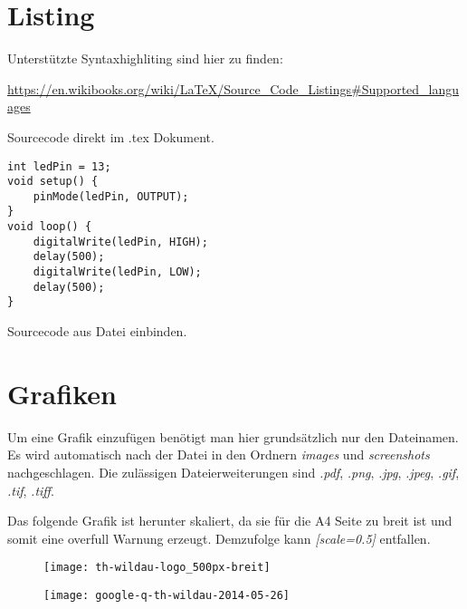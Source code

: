 \section{Listing}\label{sec:listing}

Unterstützte Syntaxhighliting sind hier zu finden: \\
\begin{footnotesize}
	\url{https://en.wikibooks.org/wiki/LaTeX/Source_Code_Listings#Supported_languages}
\end{footnotesize}
\par

Sourcecode direkt im .tex Dokument.\par

\lstset{language=C} %
\begin{lstlisting}[caption=Arduino Beispielprogramm, label=lst:arduino]
int ledPin = 13;
void setup() {
    pinMode(ledPin, OUTPUT);
}
void loop() {
    digitalWrite(ledPin, HIGH);
    delay(500);
    digitalWrite(ledPin, LOW);
    delay(500);
}
\end{lstlisting}

Sourcecode aus Datei einbinden.\par



\section{Grafiken}\label{sec:grafiken}

Um eine Grafik einzufügen benötigt man hier grundsätzlich nur den Dateinamen. Es wird automatisch nach der Datei in den Ordnern \textit{images} und \textit{screenshots} nachgeschlagen. Die zulässigen Dateierweiterungen sind \textit{.pdf}, \textit{.png}, \textit{.jpg}, \textit{.jpeg}, \textit{.gif}, \textit{.tif}, \textit{.tiff}.\par

Das folgende Grafik ist herunter skaliert, da sie für die A4 Seite zu breit ist und somit eine overfull Warnung erzeugt. Demzufolge kann \textit{[scale=0.5]} entfallen.\par

\begin{figure}[ht]
	\centering
	\texttt{[image: th-wildau-logo\_500px-breit]}
	\label{fig:thWildau050}
\end{figure}

\begin{figure}[ht]
	\centering
	\texttt{[image: google-q-th-wildau-2014-05-26]}
	\label{fig:googleThWildau}
\end{figure}
